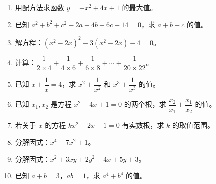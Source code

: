 \documentclass[12pt, a4paper]{ctexart}
\begin{document}
\begin{enumerate}[leftmargin=2em, label=\textbf{\arabic*.}]
  \item 用配方法求函数 $y = -x^2 + 4x + 1$ 的最大值。

  \item 已知 $a^2 + b^2 + c^2 - 2a + 4b - 6c + 14 = 0$，求 $a+b+c$ 的值。

  \item 解方程：$(x^2 - 2x)^2 - 3(x^2 - 2x) - 4 = 0$。

  \item 计算：$\dfrac{1}{2\times4} + \dfrac{1}{4\times6} + \dfrac{1}{6\times8} + \cdots + \dfrac{1}{20\times22}$。

  \item 已知 $x + \dfrac{1}{x} = 4$，求 $x^2 + \dfrac{1}{x^2}$ 和 $x^3 + \dfrac{1}{x^3}$ 的值。

  \item 已知 $x_1, x_2$ 是方程 $x^2 - 4x + 1 = 0$ 的两个根，求 $\dfrac{x_2}{x_1} + \dfrac{x_1}{x_2}$ 的值。

  \item 若关于 $x$ 的方程 $kx^2 - 2x + 1 = 0$ 有实数根，求 $k$ 的取值范围。

  \item 分解因式：$x^4 - 7x^2 + 1$。

  \item 分解因式：$x^2 + 3xy + 2y^2 + 4x + 5y + 3$。

  \item 已知 $a+b=3$，$ab=1$，求 $a^4+b^4$ 的值。
\end{enumerate}

\vspace{20pt}
\end{document}
